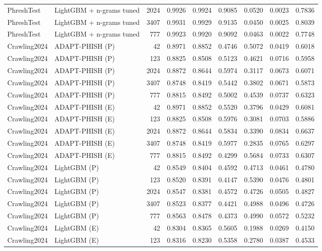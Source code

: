 \begin{table}[t]
\begin{tabular}{llrrrrrrr}
PhreshTest & LightGBM + n-grams tuned & 2024 & 0.9926 & 0.9924 & 0.9085 & 0.0520 & 0.0023 & 0.7836 \\
PhreshTest & LightGBM + n-grams tuned & 3407 & 0.9931 & 0.9929 & 0.9135 & 0.0450 & 0.0025 & 0.8039 \\
PhreshTest & LightGBM + n-grams tuned & 777 & 0.9923 & 0.9920 & 0.9092 & 0.0463 & 0.0022 & 0.7748 \\
Crawling2024 & ADAPT-PHISH (P) & 42 & 0.8971 & 0.8852 & 0.4746 & 0.5072 & 0.0419 & 0.6018 \\
Crawling2024 & ADAPT-PHISH (P) & 123 & 0.8825 & 0.8508 & 0.5123 & 0.4621 & 0.0716 & 0.5958 \\
Crawling2024 & ADAPT-PHISH (P) & 2024 & 0.8872 & 0.8644 & 0.5974 & 0.3117 & 0.0673 & 0.6071 \\
Crawling2024 & ADAPT-PHISH (P) & 3407 & 0.8748 & 0.8419 & 0.5442 & 0.3802 & 0.0671 & 0.5873 \\
Crawling2024 & ADAPT-PHISH (P) & 777 & 0.8815 & 0.8492 & 0.5002 & 0.4539 & 0.0737 & 0.6323 \\
Crawling2024 & ADAPT-PHISH (E) & 42 & 0.8971 & 0.8852 & 0.5520 & 0.3796 & 0.0429 & 0.6081 \\
Crawling2024 & ADAPT-PHISH (E) & 123 & 0.8825 & 0.8508 & 0.5976 & 0.3081 & 0.0703 & 0.5886 \\
Crawling2024 & ADAPT-PHISH (E) & 2024 & 0.8872 & 0.8644 & 0.5834 & 0.3390 & 0.0834 & 0.6637 \\
Crawling2024 & ADAPT-PHISH (E) & 3407 & 0.8748 & 0.8419 & 0.5977 & 0.2835 & 0.0765 & 0.6297 \\
Crawling2024 & ADAPT-PHISH (E) & 777 & 0.8815 & 0.8492 & 0.4299 & 0.5684 & 0.0733 & 0.6307 \\
Crawling2024 & LightGBM (P) & 42 & 0.8549 & 0.8404 & 0.4592 & 0.4713 & 0.0461 & 0.4780 \\
Crawling2024 & LightGBM (P) & 123 & 0.8520 & 0.8391 & 0.4147 & 0.5390 & 0.0476 & 0.4801 \\
Crawling2024 & LightGBM (P) & 2024 & 0.8547 & 0.8381 & 0.4572 & 0.4726 & 0.0505 & 0.4827 \\
Crawling2024 & LightGBM (P) & 3407 & 0.8523 & 0.8377 & 0.4421 & 0.4988 & 0.0496 & 0.4726 \\
Crawling2024 & LightGBM (P) & 777 & 0.8563 & 0.8478 & 0.4373 & 0.4990 & 0.0572 & 0.5232 \\
Crawling2024 & LightGBM (E) & 42 & 0.8304 & 0.8365 & 0.5605 & 0.1988 & 0.0269 & 0.4150 \\
Crawling2024 & LightGBM (E) & 123 & 0.8316 & 0.8230 & 0.5358 & 0.2780 & 0.0387 & 0.4533 \\

\end{tabular}
\end{table}
